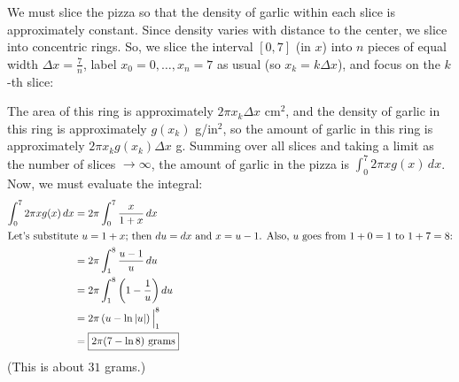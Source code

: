 \documentclass{article}
\begin{document}
\begin{enumerate}
\begin{enumerate}
    \begin{solution}
      We must slice the pizza so that the density of garlic within each
      slice is approximately constant.  Since density varies with distance
      to the center, we slice into concentric rings.  So, we slice the
      interval $[0, 7]$ (in $x$) into $n$ pieces of equal width $\Delta x
      = \frac{7}{n}$, label $x_0 = 0, \ldots, x_n = 7$ as usual (so $x_k =
      k \Delta x$), and focus on the $k$-th slice:
      \begin{center}
        \end{center}
      The area of this ring is approximately $2 \pi x_k \Delta x$ cm$^2$,
      and the density of garlic in this ring is approximately $g(x_k)$
      g/in$^2$, so the amount of garlic in this ring is approximately $2
      \pi x_k g(x_k) \Delta x$ g.  Summing over all slices and taking a
      limit as the number of slices $\to \infty$, the amount of garlic in
      the pizza is $\displaystyle \int_0^7 2 \pi x g(x)\,dx$.  Now, we
      must evaluate the integral:
      \begin{align*}
        \int_0^7 2 \pi x g(x)\,dx &= 2 \pi \int_0^7 \frac{x}{1 + x}\,dx
        \\
        \intertext{Let's substitute $u = 1 + x$; then $du = dx$ and $x = u
          - 1$.  Also, $u$ goes from $1 + 0 = 1$ to $1 + 7 = 8$:}
        &= 2 \pi \int_1^{8} \frac{u - 1}{u}\,du \\
        &= 2 \pi \int_1^8 \left( 1 - \frac{1}{u} \right) du \\
        &= 2 \pi \left( u - \ln |u| \right) \Big|_1^8 \\
        &= \boxed{2 \pi (7 - \ln 8) \text{ grams}}
      \end{align*}
      (This is about $31$ grams.)
    \end{solution}


\end{enumerate}
\end{enumerate}
\end{document}
